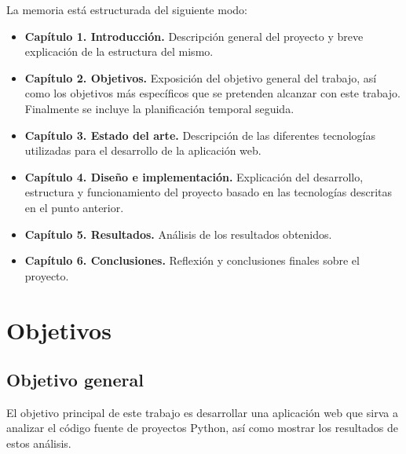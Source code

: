 \documentclass[a4paper, 12pt]{book}
\begin{document}
La memoria está estructurada del siguiente modo:

\begin{itemize}
  \item \textbf{Capítulo 1. Introducción.} Descripción general del proyecto y breve explicación de la estructura del mismo.
  
  \item \textbf{Capítulo 2. Objetivos.} Exposición del objetivo general del trabajo, así como los objetivos más específicos que se pretenden alcanzar con este trabajo. Finalmente se incluye la planificación temporal seguida.
  
  \item \textbf{Capítulo 3. Estado del arte.} Descripción de las diferentes tecnologías utilizadas para el desarrollo de la aplicación web.
  
  \item \textbf{Capítulo 4. Diseño e implementación.} Explicación del desarrollo, estructura y funcionamiento del proyecto basado en las tecnologías descritas en el punto anterior.

  \item \textbf{Capítulo 5. Resultados.} Análisis de los resultados obtenidos.

  \item \textbf{Capítulo 6. Conclusiones.} Reflexión y conclusiones finales sobre el proyecto.
\end{itemize}




\cleardoublepage
\chapter{Objetivos}
\label{chap:objetivos}

\section{Objetivo general}
\label{sec:objetivo-general}
El objetivo principal de este trabajo es desarrollar una aplicación web que sirva a analizar el código fuente de proyectos Python, así como mostrar los resultados de estos análisis.
\end{document}
